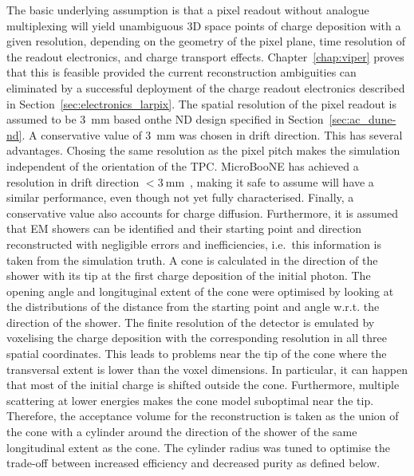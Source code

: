 The basic underlying assumption is that a pixel readout without analogue multiplexing will yield unambiguous 3D space points of charge deposition with a given resolution, depending on the geometry of the pixel plane, time resolution of the readout electronics, and charge transport effects.
Chapter~\ref{chap:viper} proves that this is feasible provided the current reconstruction ambiguities can eliminated by a successful deployment of the \larpix{} charge readout electronics described in Section~\ref{sec:electronics_larpix}.
The spatial resolution of the pixel readout is assumed to be \SI{3}{\milli\metre} based onthe ND design specified in Section~\ref{sec:ac_dune-nd}.
A conservative value of \SI{3}{\milli\meter} was chosen in drift direction.
This has several advantages.
Chosing the same resolution as the pixel pitch makes the simulation independent of the orientation of the TPC.
MicroBooNE has achieved a resolution in drift direction $< \SI{3}{\milli\metre}$~\cite{uboone}, making it safe to assume \larpix{} will have a similar performance, even though not yet fully characterised.
Finally, a conservative value also accounts for charge diffusion.
Furthermore, it is assumed that EM showers can be identified and their starting point and direction reconstructed with negligible errors and inefficiencies, i.e.\ this information is taken from the simulation truth.
A cone is calculated in the direction of the shower with its tip at the first charge deposition of the initial photon.
The opening angle and longituginal extent of the cone were optimised by looking at the distributions of the distance from the starting point and angle w.r.t. the direction of the shower.
The finite resolution of the detector is emulated by voxelising the charge deposition with the corresponding resolution in all three spatial coordinates.
This leads to problems near the tip of the cone where the transversal extent is lower than the voxel dimensions.
In particular, it can happen that most of the initial charge is shifted outside the cone.
Furthermore, multiple scattering at lower energies makes the cone model suboptimal near the tip.
Therefore, the acceptance volume for the reconstruction is taken as the union of the cone with a cylinder around the direction of the shower of the same longitudinal extent as the cone.
The cylinder radius was tuned to optimise the trade-off between increased efficiency and decreased purity as defined below.

